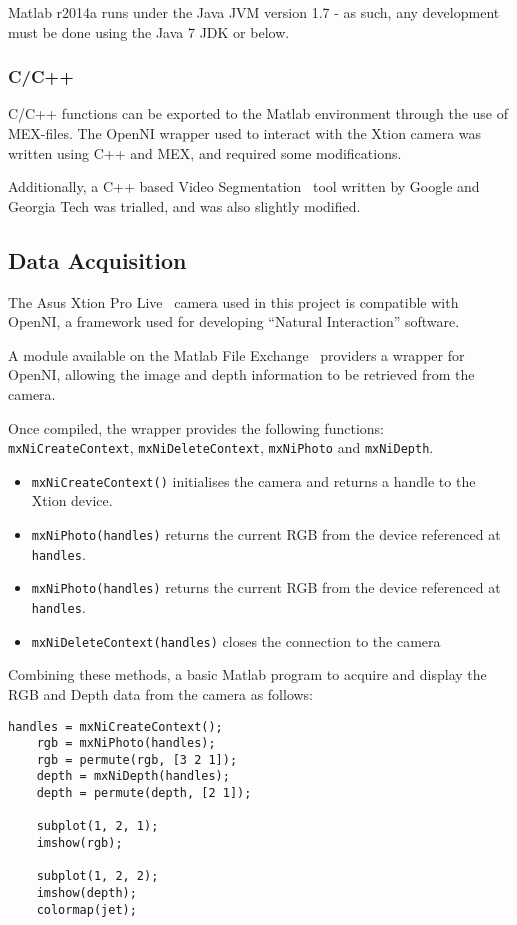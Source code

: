 Matlab r2014a runs under the Java JVM version 1.7 - as such, any development must be done using the Java 7 JDK or below. 

\subsubsection{C/C++}
C/C++ functions can be exported to the Matlab environment through the use of MEX-files. The OpenNI wrapper used to interact with the Xtion camera was written using C++ and MEX, and required some modifications.

Additionally, a C++ based Video Segmentation~\cite{videosegment} tool written by Google and Georgia Tech was trialled, and was also slightly modified.

\subsection{Data Acquisition}
The Asus Xtion Pro Live~\cite{xtion} camera used in this project is compatible with OpenNI, a framework used for developing ``Natural Interaction'' software.

A module available on the Matlab File Exchange~\cite{matlabwrapper} providers a wrapper for OpenNI, allowing the image and depth information to be retrieved from the camera.

Once compiled, the wrapper provides the following functions: \texttt{mxNiCreateContext}, \texttt{mxNiDeleteContext}, \texttt{mxNiPhoto} and \texttt{mxNiDepth}.

\begin{itemize}
    \item \texttt{mxNiCreateContext()} initialises the camera and returns a handle to the Xtion device.
    \item \texttt{mxNiPhoto(handles)} returns the current \ac{RGB} from the device referenced at \texttt{handles}.
    \item \texttt{mxNiPhoto(handles)} returns the current \ac{RGB} from the device referenced at \texttt{handles}.
    \item \texttt{mxNiDeleteContext(handles)} closes the connection to the camera 
\end{itemize}

Combining these methods, a basic Matlab program to acquire and display the RGB and Depth data from the camera as follows: 

\begin{lstlisting}[caption = {Acquiring Depth and RGB in Matlab}]
    handles = mxNiCreateContext();
    rgb = mxNiPhoto(handles);
    rgb = permute(rgb, [3 2 1]);
    depth = mxNiDepth(handles);
    depth = permute(depth, [2 1]);

    subplot(1, 2, 1);
    imshow(rgb);

    subplot(1, 2, 2);
    imshow(depth);
    colormap(jet);
\end{lstlisting}


